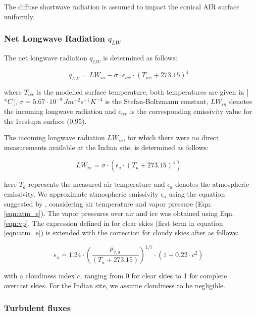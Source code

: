 \documentclass[utf8]{frontiersSCNS} %
\begin{document}
The diffuse shortwave radiation is assumed to impact the conical AIR surface uniformly.

\subsubsection{Net Longwave Radiation \texorpdfstring{$q_{LW}$}{Lg}}

The net longwave radiation $q_{LW}$ is determined as follows:

\begin{equation} q_{LW}= LW_{in}-\sigma \cdot \epsilon_{ice} \cdot {(T_{ice}+ 273.15)}^4
	\label{eqn:LW} \end{equation}

where $T_{ice}$ is the modelled surface temperature, both temperatures are given in [$\degree C$], $\sigma=5.67\cdot
	10^{-8}\,Jm^{-2}s^{-1}K^{-4}$ is the Stefan-Boltzmann constant, $LW_{in}$ denotes the incoming longwave radiation and
$\epsilon_{ice}$ is the corresponding emissivity value for the Icestupa surface (0.95).

The incoming longwave radiation $LW_{in}$, for which there were no direct measurements available at the Indian site, is determined
as follows:

\begin{equation} LW_{in}=\sigma \cdot (\epsilon_a \cdot {(T_a+ 273.15)}^4)
	\label{eqn:LWin} \end{equation}

here  $T_a$ represents the measured air temperature and $\epsilon_a$ denotes the atmospheric emissivity. We approximate atmospheric emissivity $\epsilon_a$ using the
equation suggested by \cite{Brutsaert_1982}, considering air temperature and vapor pressure (Eqn.  \ref{eqn:atm_e}). The
vapor pressures over air and ice was obtained using Eqn. \ref{eqn:vp}.  The expression defined in \cite{Brutsaert_1975}
for clear skies (first term in equation \ref{eqn:atm_e}) is extended with the correction for cloudy skies after
\cite{Brutsaert_1982} as follows:

\begin{equation} \epsilon_a=1.24 \cdot (\frac{p_{v,a}}{(T_a+273.15)})^{1/7}\cdot(1+0.22\cdot{c}^2) \label{eqn:atm_e}
\end{equation}

with a cloudiness index $c$, ranging from 0 for clear skies to 1 for complete overcast skies. For the Indian site, we
assume cloudiness to be negligible.

\subsubsection{Turbulent fluxes }
\end{document}

